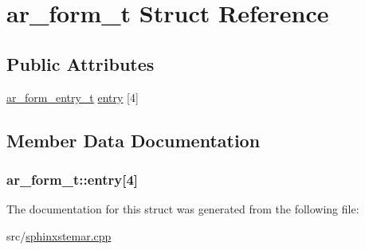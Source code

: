 \hypertarget{structar__form__t}{\section{ar\-\_\-form\-\_\-t Struct Reference}
\label{structar__form__t}
}
\subsection*{Public Attributes}
\begin{DoxyCompactItemize}
\item 
\hyperlink{structar__form__entry__t}{ar\-\_\-form\-\_\-entry\-\_\-t} \hyperlink{structar__form__t_a2ef1b1e36e2a69537c3570cb29958557}{entry} \mbox{[}4\mbox{]}
\end{DoxyCompactItemize}


\subsection{Member Data Documentation}
\hypertarget{structar__form__t_a2ef1b1e36e2a69537c3570cb29958557}{
\subsubsection[{entry}]{ ar\-\_\-form\-\_\-t\-::entry\mbox{[}4\mbox{]}}}\label{structar__form__t_a2ef1b1e36e2a69537c3570cb29958557}


The documentation for this struct was generated from the following file\-:\begin{DoxyCompactItemize}
\item 
src/\hyperlink{sphinxstemar_8cpp}{sphinxstemar.\-cpp}\end{DoxyCompactItemize}
